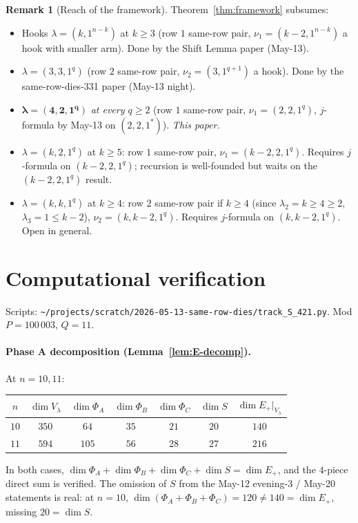 \documentclass[11pt]{article}
\theoremstyle{definition}
\newtheorem{remark}[theorem]{Remark}
\begin{document}
\begin{remark}[Reach of the framework]\label{rem:reach}
Theorem~\ref{thm:framework} subsumes:
\begin{itemize}[leftmargin=2em,topsep=0.2em,itemsep=0.1em]
\item Hooks $\lambda = (k, 1^{n-k})$ at $k \ge 3$ (row $1$ same-row
pair, $\nu_1 = (k-2, 1^{n-k})$ a hook with smaller arm). Done by the
Shift Lemma paper (May-13).
\item $\lambda = (3, 3, 1^q)$ (row $2$ same-row pair, $\nu_2 = (3, 1^{q+1})$
a hook). Done by the same-row-dies-331 paper (May-13 night).
\item $\boldsymbol{\lambda = (4, 2, 1^q)}$ \emph{at every $q \ge 2$}
(row $1$ same-row pair, $\nu_1 = (2, 2, 1^q)$, $j$-formula by May-13
on $(2, 2, 1^*)$). \emph{This paper.}
\item $\lambda = (k, 2, 1^q)$ at $k \ge 5$: row $1$ same-row pair,
$\nu_1 = (k-2, 2, 1^q)$. Requires $j$-formula on $(k-2, 2, 1^q)$;
recursion is well-founded but waits on the $(k-2, 2, 1^q)$ result.
\item $\lambda = (k, k, 1^q)$ at $k \ge 4$: row $2$ same-row pair if
$k \ge 4$ (since $\lambda_2 = k \ge 4 \ge 2$, $\lambda_3 = 1 \le k - 2$),
$\nu_2 = (k, k-2, 1^q)$. Requires $j$-formula on $(k, k-2, 1^q)$. Open
in general.
\end{itemize}
\end{remark}

\section{Computational verification}\label{sec:verify}

Scripts: \texttt{\textasciitilde/projects/scratch/2026-05-13-same-row-dies/track\_S\_421.py}.
Mod $P = 100\,003$, $Q = 11$.

\paragraph{Phase A decomposition (Lemma~\ref{lem:E-decomp}).} At
$n = 10, 11$:
\begin{center}
\begin{tabular}{ccccccc}
\toprule
$n$ & $\dim V_\lambda$ & $\dim \Phi_A$ & $\dim \Phi_B$ & $\dim \Phi_C$ &
$\dim S$ & $\dim E_+|_{V_\lambda}$\\
\midrule
$10$ & $350$ & $64$ & $35$ & $21$ & $20$ & $140$ \\
$11$ & $594$ & $105$ & $56$ & $28$ & $27$ & $216$ \\
\bottomrule
\end{tabular}
\end{center}
In both cases, $\dim \Phi_A + \dim \Phi_B + \dim \Phi_C + \dim S =
\dim E_+$, and the $4$-piece direct sum is verified. The omission of
$S$ from the May-12 evening-3 / May-20 statements is real: at
$n = 10$, $\dim(\Phi_A + \Phi_B + \Phi_C) = 120 \ne 140 = \dim E_+$,
missing $20 = \dim S$.
\end{document}
